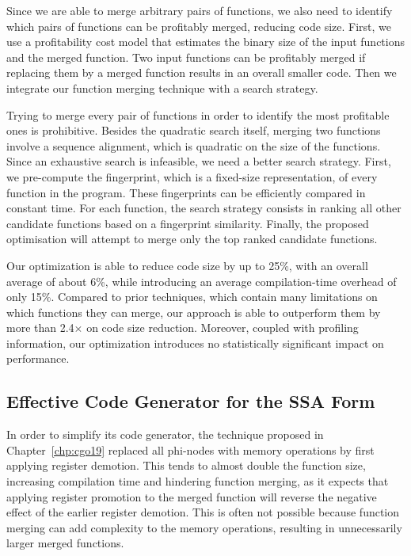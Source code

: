 Since we are able to merge arbitrary pairs of functions, we also need to identify which pairs of functions can be profitably merged, reducing code size.
First, we use a profitability cost model that estimates the binary size of the input functions and the merged function.
Two input functions can be profitably merged if replacing them by a merged function results in an overall smaller code.
Then we integrate our function merging technique with a search strategy.

Trying to merge every pair of functions in order to identify the most profitable ones is prohibitive.
Besides the quadratic search itself, merging two functions involve a sequence alignment, which is quadratic on the size of the functions.
Since an exhaustive search is infeasible, we need a better search strategy.
First, we pre-compute the fingerprint, which is a fixed-size representation, of every function in the program.
These fingerprints can be efficiently compared in constant time.
For each function, the search strategy consists in ranking all other candidate functions based on a fingerprint similarity.
Finally, the proposed optimisation will attempt to merge only the top ranked candidate functions.

Our optimization is able to reduce code size by up to 25\%, with an overall average of about 6\%, while introducing an average compilation-time overhead of only 15\%.
Compared to prior techniques, which contain many limitations on which functions they can merge, our approach is able to outperform them by more than 2.4$\times$ on code size reduction.
Moreover, coupled with profiling information, our optimization introduces no statistically significant impact on performance.

\subsection{Effective Code Generator for the SSA Form}

In order to simplify its code generator, the technique proposed in Chapter~\ref{chp:cgo19} replaced all phi-nodes with memory operations by first applying register demotion.
This tends to almost double the function size, increasing compilation time and hindering function merging, as it expects that applying register promotion to the merged function will reverse the negative effect of the earlier register demotion.
This is often not possible because function merging can add complexity to the memory operations, resulting in unnecessarily larger merged functions.

